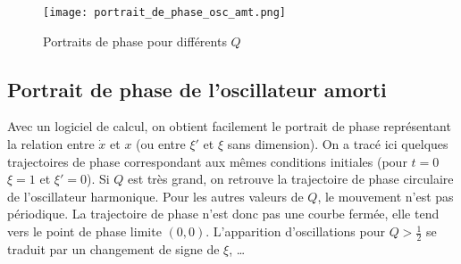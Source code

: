 \begin{figure}%
  \centering
  \texttt{[image: portrait\_de\_phase\_osc\_amt.png]}%
  \caption{Portraits de phase pour différents \(Q\)}%
  \label{fig:portrait_de_phase}
\end{figure}
%
\subsection{Portrait de phase de l'oscillateur amorti}%
\label{chap5-subsec:portraitdephasedeloscillateuramorti}%
%
Avec un logiciel de calcul, on obtient facilement le portrait de phase
représentant la relation entre \(\dot x\) et \(x\) (ou entre \(\xi'\) et
\(\xi\) sans dimension). On a tracé ici quelques trajectoires de phase
correspondant aux mêmes conditions initiales (pour \(t=0\) \(\xi=1\) et
\(\xi'=0\)). Si \(Q\) est très grand, on retrouve la trajectoire de phase
circulaire de l'oscillateur harmonique. Pour les autres valeurs de \(Q\), le
mouvement n'est pas périodique. La trajectoire de phase n'est donc pas une
courbe fermée, elle tend vers le point de phase limite \((0,0)\). L'apparition
d'oscillations pour \(Q>\frac{1}{2}\) se traduit par un changement de signe de
\(\xi\), \ldots
%
\clearpage
